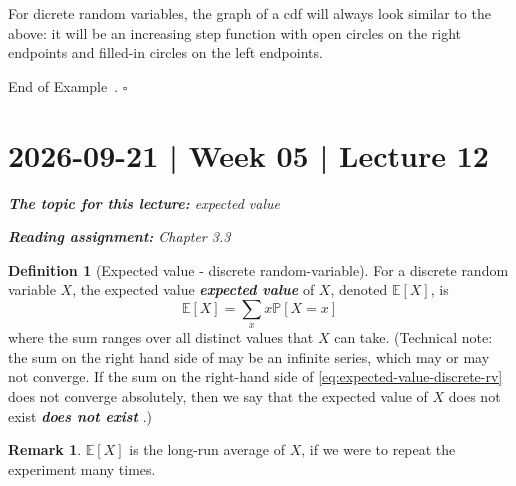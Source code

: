 \documentclass[10pt]{article}
\theoremstyle{definition}
\newtheorem{definition}[theorem]{Definition}
\newtheorem{remark}[theorem]{Remark}
\newtheorem{example}[theorem]{Example}
\renewenvironment{example}
{\begin{oldexample}}
  {\par\smallskip\hfill   End of Example~\theexample. $\square$    \par\end{oldexample}}
\newcommand{\1}[1]{\textbf{1}_{\left[#1\right]}} %
\def\E{\mathbb{E}} %
\def\P{\mathbb{P}} %
\DeclareRobustCommand{\demph}[1]{%
  \ifmmode
  {\color{Blue}#1}%
  \else
  {\color{Blue}\bfseries\slshape #1}%
  \fi
}
\begin{document}
\begin{example}
\begin{center}
  \end{center}

  For dicrete random variables, the graph of a cdf will always look similar to
  the above: it will be an increasing step function with open circles on the
  right endpoints and filled-in circles on the left endpoints.
\end{example}
\newpage
\section{2026-09-21 | Week 05 | Lecture 12}


\begin{center}
  \begin{tcolorbox}[width=0.9\textwidth, colback=white, colframe=black]
    \textit{\textbf{The topic for this lecture:} expected value}

    \textit{\textbf{Reading assignment:} Chapter 3.3}
  \end{tcolorbox}
\end{center}



\begin{definition}[Expected value - discrete random-variable]
  \label{def:expected-value-discrete-random-variable}
  For a discrete random variable $X$, the \demph{expected value} of $X$,
  denoted $\E\left[X \right]$, is
  \begin{equation}\label{eq:expected-value-discrete-rv}
    \E\left[X \right] = \sum_{x}x \P\left[X=x \right] 
  \end{equation}
  where the sum ranges over all distinct values that $X$ can take. (Technical
  note: the sum on the right hand side of may be an infinite series, which may
  or may not converge. If the sum on the right-hand side of
  \cref{eq:expected-value-discrete-rv} does not converge absolutely, then we
  say that the expected value of $X$ \demph{does not exist}.)
\end{definition}

\begin{remark}
  $\E\left[X \right]$ is the long-run average of $X$, if we were to repeat the
  experiment many times.
\end{remark}
\end{document}
